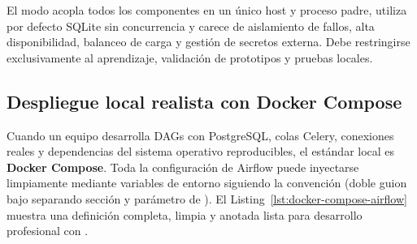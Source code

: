 \begin{warningbox}
El modo  acopla todos los componentes en un único host y proceso padre, utiliza por defecto SQLite sin concurrencia y carece de aislamiento de fallos, alta disponibilidad, balanceo de carga y gestión de secretos externa. Debe restringirse exclusivamente al aprendizaje, validación de prototipos y pruebas locales.
\end{warningbox}

\subsection{Despliegue local realista con Docker Compose}\label{subsec:docker-compose}

Cuando un equipo desarrolla DAGs con PostgreSQL, colas Celery, conexiones reales y dependencias del sistema operativo reproducibles, el estándar local es \textbf{Docker Compose}. Toda la configuración de Airflow puede inyectarse limpiamente mediante variables de entorno siguiendo la convención  (doble guion bajo separando sección y parámetro de ). El Listing~\ref{lst:docker-compose-airflow} muestra una definición completa, limpia y anotada lista para desarrollo profesional con .

